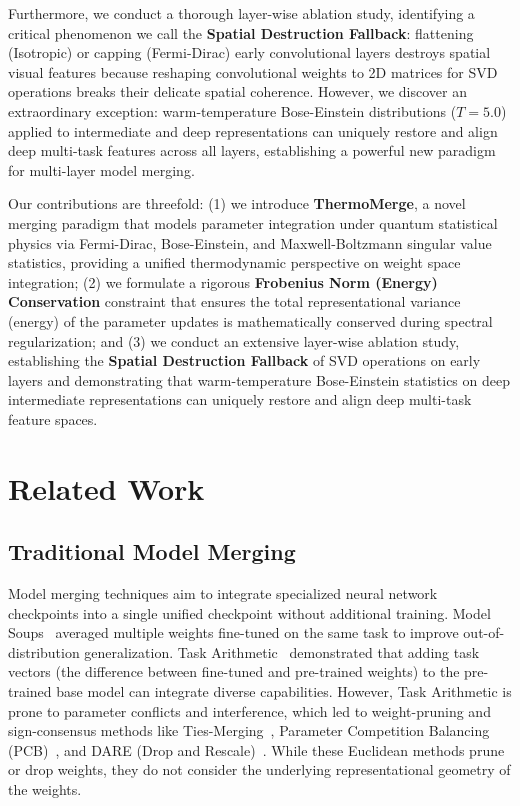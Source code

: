 \documentclass{article}
\theoremstyle{plain}
\theoremstyle{definition}
\theoremstyle{remark}
\begin{document}
Furthermore, we conduct a thorough layer-wise ablation study, identifying a critical phenomenon we call the \textbf{Spatial Destruction Fallback}: flattening (Isotropic) or capping (Fermi-Dirac) early convolutional layers destroys spatial visual features because reshaping convolutional weights to 2D matrices for SVD operations breaks their delicate spatial coherence. However, we discover an extraordinary exception: warm-temperature Bose-Einstein distributions ($T=5.0$) applied to intermediate and deep representations can uniquely restore and align deep multi-task features across all layers, establishing a powerful new paradigm for multi-layer model merging.

Our contributions are threefold: (1) we introduce \textbf{ThermoMerge}, a novel merging paradigm that models parameter integration under quantum statistical physics via Fermi-Dirac, Bose-Einstein, and Maxwell-Boltzmann singular value statistics, providing a unified thermodynamic perspective on weight space integration; (2) we formulate a rigorous \textbf{Frobenius Norm (Energy) Conservation} constraint that ensures the total representational variance (energy) of the parameter updates is mathematically conserved during spectral regularization; and (3) we conduct an extensive layer-wise ablation study, establishing the \textbf{Spatial Destruction Fallback} of SVD operations on early layers and demonstrating that warm-temperature Bose-Einstein statistics on deep intermediate representations can uniquely restore and align deep multi-task feature spaces.

\section{Related Work}
\label{sec:related}

\subsection{Traditional Model Merging}
Model merging techniques aim to integrate specialized neural network checkpoints into a single unified checkpoint without additional training. Model Soups~\cite{wortsman22} averaged multiple weights fine-tuned on the same task to improve out-of-distribution generalization. Task Arithmetic~\cite{ilharco23} demonstrated that adding task vectors (the difference between fine-tuned and pre-trained weights) to the pre-trained base model can integrate diverse capabilities. However, Task Arithmetic is prone to parameter conflicts and interference, which led to weight-pruning and sign-consensus methods like Ties-Merging~\cite{yadav24}, Parameter Competition Balancing (PCB)~\cite{du24}, and DARE (Drop and Rescale)~\cite{yu24}. While these Euclidean methods prune or drop weights, they do not consider the underlying representational geometry of the weights.
\end{document}
